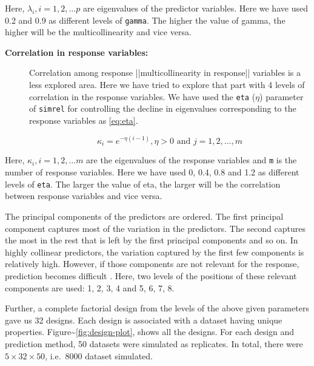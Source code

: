 \documentclass[12pt,3p,authoryear]{elsarticle}
\providecommand{\tightlist}{%
  \setlength{\itemsep}{0pt}\setlength{\parskip}{0pt}}
\begin{document}
Here, \(\lambda_i, i = 1, 2, \ldots p\) are eigenvalues of the predictor
variables. Here we have used 0.2 and 0.9 as different levels of
\texttt{gamma}. The higher the value of gamma, the higher will be the
multicollinearity and vice versa.

\begin{description}
\item[\textbf{Correlation in response variables:}]
Correlation among response \alert{||multicollinearity in response||}
variables is a less explored area. Here we have tried to explore that
part with 4 levels of correlation in the response variables. We have
used the \texttt{eta} (\(\eta\)) parameter of \texttt{simrel} for
controlling the decline in eigenvalues corresponding to the response
variables as \eqref{eq:eta}.

\begin{equation}
  \kappa_i = e^{-\eta(i - 1)}, \eta > 0 \text{ and } j = 1, 2, \ldots, m
  \label{eq:eta}
\end{equation}
\end{description}

Here, \(\kappa_i, i = 1, 2, \ldots m\) are the eigenvalues of the
response variables and \texttt{m} is the number of response variables.
Here we have used 0, 0.4, 0.8 and 1.2 as different levels of
\texttt{eta}. The larger the value of eta, the larger will be the
correlation between response variables and vice versa.

\begin{description}
\tightlist
\item[\textbf{Position of predictor components relevant to the
response:}]
The principal components of the predictors are ordered. The first
principal component captures most of the variation in the predictors.
The second captures the most in the rest that is left by the first
principal components and so on. In highly collinear predictors, the
variation captured by the first few components is relatively high.
However, if those components are not relevant for the response,
prediction becomes difficult \citep{Helland1994b}. Here, two levels of
the positions of these relevant components are used: 1, 2, 3, 4 and 5,
6, 7, 8.
\end{description}

Further, a complete factorial design from the levels of the above given
parameters gave us 32 designs. Each design is associated with a dataset
having unique properties. Figure\textasciitilde{}\ref{fig:design-plot},
shows all the designs. For each design and prediction method, 50
datasets were simulated as replicates. In total, there were
\(5 \times 32 \times 50\), i.e.~8000 dataset simulated.
\end{document}
